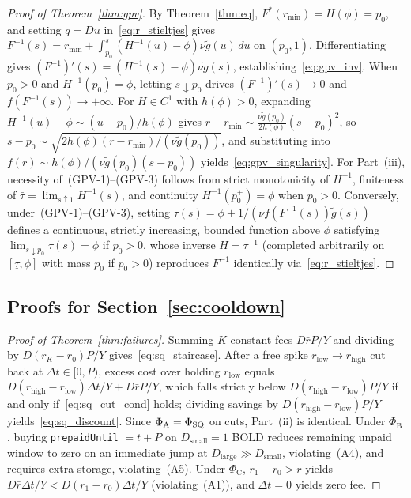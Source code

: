 \begin{proof}[Proof of Theorem~\ref{thm:gpv}]
By Theorem~\ref{thm:eq}, $F^*(r_{\min}) = H(\phi) = p_0$, and setting $q = Du$ in~\eqref{eq:r_stieltjes} gives $F^{-1}(s) = r_{\min} + \int_{p_0}^s (H^{-1}(u) - \phi)\nu\tilde{g}(u)\,du$ on $(p_0, 1)$. Differentiating gives $(F^{-1})'(s) = (H^{-1}(s) - \phi)\nu\tilde{g}(s)$, establishing~\eqref{eq:gpv_inv}. When $p_0 > 0$ and $H^{-1}(p_0) = \phi$, letting $s \downarrow p_0$ drives $(F^{-1})'(s) \to 0$ and $f(F^{-1}(s)) \to +\infty$. For $H \in C^1$ with $h(\phi) > 0$, expanding $H^{-1}(u) - \phi \sim (u - p_0)/h(\phi)$ gives $r - r_{\min} \sim \frac{\nu\tilde{g}(p_0)}{2h(\phi)}(s - p_0)^2$, so $s - p_0 \sim \sqrt{2h(\phi)(r - r_{\min})/(\nu\tilde{g}(p_0))}$, and substituting into $f(r) \sim h(\phi)/(\nu\tilde{g}(p_0)(s - p_0))$ yields~\eqref{eq:gpv_singularity}. For Part~(iii), necessity of~(GPV-1)--(GPV-3) follows from strict monotonicity of $H^{-1}$, finiteness of $\bar{\tau} = \lim_{s \uparrow 1} H^{-1}(s)$, and continuity $H^{-1}(p_0^+) = \phi$ when $p_0 > 0$. Conversely, under~(GPV-1)--(GPV-3), setting $\tau(s) = \phi + 1/(\nu f(F^{-1}(s))\tilde{g}(s))$ defines a continuous, strictly increasing, bounded function above $\phi$ satisfying $\lim_{s \downarrow p_0}\tau(s) = \phi$ if $p_0 > 0$, whose inverse $H = \tau^{-1}$ (completed arbitrarily on $[\underline{\tau}, \phi]$ with mass $p_0$ if $p_0 > 0$) reproduces $F^{-1}$ identically via~\eqref{eq:r_stieltjes}.
\end{proof}

\subsection{Proofs for Section~\ref{sec:cooldown}}\label{app:proofs_cooldown}

\begin{proof}[Proof of Theorem~\ref{thm:failures}]
Summing $K$ constant fees $D\bar{r}P/Y$ and dividing by $D(r_K - r_0)P/Y$ gives~\eqref{eq:sq_staircase}. After a free spike $r_{\mathrm{low}} \to r_{\mathrm{high}}$ cut back at $\Delta t \in [0, P)$, excess cost over holding $r_{\mathrm{low}}$ equals $D(r_{\mathrm{high}} - r_{\mathrm{low}})\Delta t/Y + D\bar{r}P/Y$, which falls strictly below $D(r_{\mathrm{high}} - r_{\mathrm{low}})P/Y$ if and only if~\eqref{eq:sq_cut_cond} holds; dividing savings by $D(r_{\mathrm{high}} - r_{\mathrm{low}})P/Y$ yields~\eqref{eq:sq_discount}. Since $\Phi_{\mathrm{A}} = \Phi_{\mathrm{SQ}}$ on cuts, Part~(ii) is identical. Under $\Phi_{\mathrm{B}}$, buying \texttt{prepaidUntil} $= t + P$ on $D_{\mathrm{small}} = 1$ BOLD reduces remaining unpaid window to zero on an immediate jump at $D_{\mathrm{large}} \gg D_{\mathrm{small}}$, violating~(A4), and requires extra storage, violating~(A5). Under $\Phi_{\mathrm{C}}$, $r_1 - r_0 > \bar{r}$ yields $D\bar{r}\Delta t/Y < D(r_1 - r_0)\Delta t/Y$ (violating~(A1)), and $\Delta t = 0$ yields zero fee.
\end{proof}

